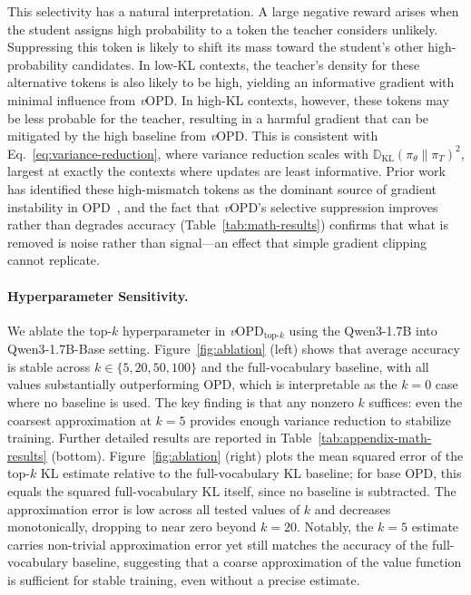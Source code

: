 \documentclass{article}
\newcommand{\method}{\emph{v}OPD}
\begin{document}
This selectivity has a natural interpretation. A large negative reward arises when the student assigns high probability to a token the teacher considers unlikely. Suppressing this token is likely to shift its mass toward the student's other high-probability candidates. In low-KL contexts, the teacher's density for these alternative tokens is also likely to be high, yielding an informative gradient with minimal influence from \method{}. In high-KL contexts, however, these tokens may be less probable for the teacher, resulting in a harmful gradient that can be mitigated by the high baseline from \method{}. This is consistent with Eq.~\eqref{eq:variance-reduction}, where variance reduction scales with $\mathbb{D}_\mathrm{KL}(\pi_\theta\|\pi_T)^2$, largest at exactly the contexts where updates are least informative. Prior work has identified these high-mismatch tokens as the dominant source of gradient instability in OPD~\citep{li2026rethinkingopd}, and the fact that \method{}'s selective suppression improves rather than degrades accuracy (Table~\ref{tab:math-results}) confirms that what is removed is noise rather than signal---an effect that simple gradient clipping cannot replicate.

\paragraph{Hyperparameter Sensitivity.}
\label{sec:exp_ablation}
We ablate the top-$k$ hyperparameter in \method{}$_\text{top-$k$}$ using the Qwen3-1.7B into Qwen3-1.7B-Base setting. Figure~\ref{fig:ablation} (left) shows that average accuracy is stable across $k \in \{5, 20, 50, 100\}$ and the full-vocabulary baseline, with all values substantially outperforming OPD, which is interpretable as the $k{=}0$ case where no baseline is used. The key finding is that any nonzero $k$ suffices: even the coarsest approximation at $k{=}5$ provides enough variance reduction to stabilize training. Further detailed results are reported in Table~\ref{tab:appendix-math-results} (bottom). Figure~\ref{fig:ablation} (right) plots the mean squared error of the top-$k$ KL estimate relative to the full-vocabulary KL baseline; for base OPD, this equals the squared full-vocabulary KL itself, since no baseline is subtracted. The approximation error is low across all tested values of $k$ and decreases monotonically, dropping to near zero beyond $k{=}20$. Notably, the $k{=}5$ estimate carries non-trivial approximation error yet still matches the accuracy of the full-vocabulary baseline, suggesting that a coarse approximation of the value function is sufficient for stable training, even without a precise estimate.
\end{document}
